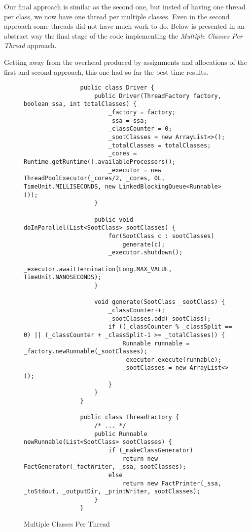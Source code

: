 \documentclass{dithesis}
\begin{document}
        Our final approach is similar as the second one, but insted of having one thread per class, we now have one thread per multiple classes. Even in the second approach some threads did not have much work to do. Below is presented in an abstract way the final stage of the code implementing the \textit{Multiple Classes Per Thread} approach.

        Getting away from the overhead produced by assignments and allocations of the first and second approach, this one had so far the best time results.

        \begin{figure}[H]
            \begin{lstlisting}
                public class Driver {
                    public Driver(ThreadFactory factory, boolean ssa, int totalClasses) {
                        _factory = factory;
                        _ssa = ssa;
                        _classCounter = 0;
                        _sootClasses = new ArrayList<>();
                        _totalClasses = totalClasses;
                        _cores = Runtime.getRuntime().availableProcessors();
                        _executor = new ThreadPoolExecutor(_cores/2, _cores, 0L, TimeUnit.MILLISECONDS, new LinkedBlockingQueue<Runnable>());
                    }

                    public void doInParallel(List<SootClass> sootClasses) {
                        for(SootClass c : sootClasses)
                            generate(c);
                        _executor.shutdown();
                        _executor.awaitTermination(Long.MAX_VALUE, TimeUnit.NANOSECONDS);
                    }

                    void generate(SootClass _sootClass) {
                        _classCounter++;
                        _sootClasses.add(_sootClass);
                        if ((_classCounter % _classSplit == 0) || (_classCounter + _classSplit-1 >= _totalClasses)) {
                            Runnable runnable = _factory.newRunnable(_sootClasses);
                            _executor.execute(runnable);
                            _sootClasses = new ArrayList<>();
                        }
                    }
                }

                public class ThreadFactory {
                    /* ... */
                    public Runnable newRunnable(List<SootClass> sootClasses) {
                        if (_makeClassGenerator)
                            return new FactGenerator(_factWriter, _ssa, sootClasses);
                        else
                            return new FactPrinter(_ssa, _toStdout, _outputDir, _printWriter, sootClasses);
                    }
                }
            \end{lstlisting}
        \caption{Multiple Classes Per Thread}
        \end{figure}
\end{document}
